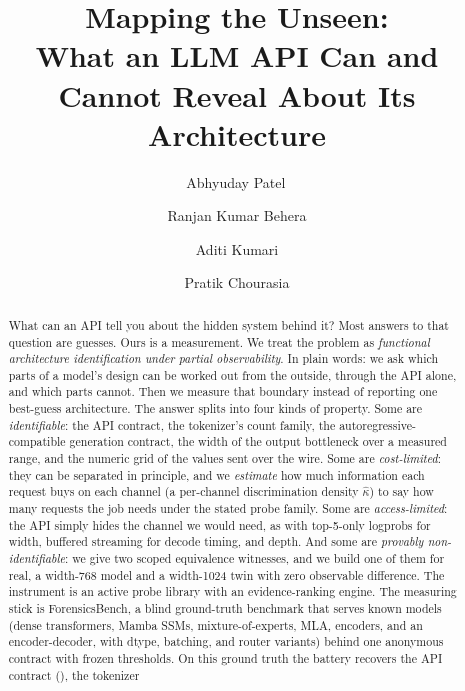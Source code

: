 \documentclass[preprint,11pt]{elsarticle}
\newcommand{\benchname}{ForensicsBench}
\begin{document}
\begin{frontmatter}
\title{\textbf{Mapping the Unseen:\\[2pt] What an LLM API Can and Cannot Reveal About Its Architecture}}
\author[1]{Abhyuday Patel\,}
\author[1]{Ranjan Kumar Behera}
\author[2]{Aditi Kumari}
\author[1]{Pratik Chourasia}
\begin{abstract}
What can an API tell you about the hidden system behind it?  Most answers to that
question are guesses.  Ours is a measurement.  We treat the problem as
\emph{functional architecture identification under partial observability}.  In plain
words: we ask which parts of a model's design can be worked out from the outside,
through the API alone, and which parts cannot.  Then we measure that boundary instead
of reporting one best-guess architecture.  The answer splits into four kinds of
property.  Some are \emph{identifiable}: the API contract, the tokenizer's count
family, the autoregressive-compatible generation contract, the width of the output
bottleneck over a measured range, and the numeric grid of the values sent over the
wire.  Some are \emph{cost-limited}: they can be separated in principle, and we
\emph{estimate} how much information each request buys on each channel (a per-channel
discrimination density $\hat\kappa$) to say how many requests the job needs under the
stated probe family.  Some are \emph{access-limited}: the API simply hides the channel
we would need, as with top-5-only logprobs for width, buffered streaming for decode
timing, and depth.  And some are \emph{provably non-identifiable}: we give two scoped
equivalence witnesses, and we build one of them for real, a width-768 model and a
width-1024 twin with zero observable difference.  The instrument is an active probe
library with an evidence-ranking engine.  The measuring stick is \benchname{}, a blind
ground-truth benchmark that serves \BenchN{} known models (dense transformers, Mamba
SSMs, mixture-of-experts, MLA, encoders, and an encoder-decoder, with dtype, batching,
and router variants) behind one anonymous contract with frozen thresholds.  On this
ground truth the battery recovers the API contract (\ContractAcc), the tokenizer

\end{abstract}
\end{frontmatter}
\end{document}
